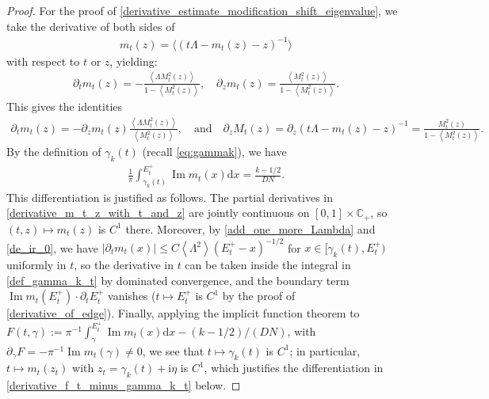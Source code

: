 \documentclass[10pt,reqno]{amsart}
\numberwithin{equation}{section}
\numberwithin{figure}{section}
\theoremstyle{plain} %
\theoremstyle{definition} %
\newcommand{\C}{\mathbb{C}}
\newcommand{\ii}{\mathrm{i}}
\newcommand{\p}[1]{({#1})}
\newcommand{\pa}[1]{\left({#1}\right)}
\newcommand{\avga}[1]{\left\langle #1 \right\rangle}
\DeclareMathOperator{\im}{\mathrm{Im}}
\newcommand{\rd}{\mathrm{d}}
\numberwithin{equation}{section}
\begin{document}
\begin{proof}
    
For the proof of \eqref{derivative_estimate_modification_shift_eigenvalue}, we take the derivative of both sides of 
    \begin{equation}\nonumber
        \begin{aligned}
            m_t (z) =\big\langle{\pa{t\Lambda-m_t (z) -z}^{-1}}\big\rangle
        \end{aligned}
    \end{equation}
    with respect to $t$ or $z$, yielding: \begin{equation}\label{derivative_m_t_z_with_t_and_z}
        \begin{aligned}
            \partial_t m_t (z) =-\frac{\avga{\Lambda M_t^2 (z) }}{1-\avga{M_t^2 (z) }},\quad
            \partial_z m_t (z) =\frac{\avga{M_t^2 (z) }}{1-\avga{M_t^2 (z) }}.
        \end{aligned}
    \end{equation}
   This gives the identities 
    \begin{equation}\label{replace_derivative}
        \begin{aligned}
            \partial_t m_t (z) =-\partial_z m_t (z) \frac{\avga{\Lambda M_t^2 (z) }}{\avga{ M_t^2\pa
            z}},\quad \text{and}\quad \partial_z M_t (z) =\partial_z \pa{t\Lambda-m_t (z) -z}^{-1}=\frac{M_t^2 (z) }{1-\avga{M_t^2 (z) }}.
        \end{aligned}
    \end{equation}
    By the definition of $\gamma_k\pa{t}$ (recall \eqref{eq:gammak}), we have 
    \begin{equation}\label{def_gamma_k_t}
        \begin{aligned}
            \frac{1}{\pi}\int_{\gamma_k\p{t}}^{E_t^+} \im m_t\pa{x} \rd x=\frac{k-1/2}{DN}.
        \end{aligned}
    \end{equation}
    This differentiation is justified as follows. The partial derivatives in \eqref{derivative_m_t_z_with_t_and_z} are jointly continuous on $[0,1]\times\C_+$, so $(t,z)\mapsto m_t(z)$ is $C^1$ there. Moreover, by \eqref{add_one_more_Lambda} and \eqref{de_ir_0}, we have $|\partial_t m_t(x)|\le C\avga{\Lambda^2}(E_t^+-x)^{-1/2}$ for $x\in[\gamma_k(t),E_t^+)$ uniformly in $t$, so the derivative in $t$ can be taken inside the integral in \eqref{def_gamma_k_t} by dominated convergence, and the boundary term $\im m_t(E_t^+)\cdot\partial_t E_t^+$ vanishes ($t\mapsto E_t^+$ is $C^1$ by the proof of \eqref{derivative_of_edge}). Finally, applying the implicit function theorem to $F(t,\gamma):=\pi^{-1}\int_{\gamma}^{E_t^+}\im m_t(x)\rd x-(k-1/2)/(DN)$, with $\partial_\gamma F=-\pi^{-1}\im m_t(\gamma)\ne 0$, we see that $t\mapsto\gamma_k(t)$ is $C^1$; in particular, $t\mapsto m_t(z_t)$ with $z_t=\gamma_k(t)+\ii\eta$ is $C^1$, which justifies the differentiation in \eqref{derivative_f_t_minus_gamma_k_t} below.

\end{proof}
\end{document}
